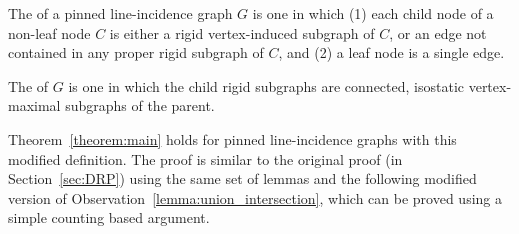 \begin{definition}
    The  of a pinned line-incidence graph $G$ is one in which (1) each child node of a non-leaf node $C$ is either a  rigid vertex-induced subgraph of $C$, or an edge not contained in any  proper rigid subgraph of $C$, and (2) a leaf node is a single edge.

    The   of $G$  is one in which the  child rigid subgraphs are connected, isostatic vertex-maximal subgraphs of the parent.
\end{definition}


Theorem~\ref{theorem:main} holds for pinned line-incidence graphs with this modified definition. The proof is similar to the original proof (in Section~\ref{sec:DRP}) using the same set of lemmas and
%
%
the following modified version of Observation~\ref{lemma:union_intersection},
which  can be proved using a simple counting based argument.



